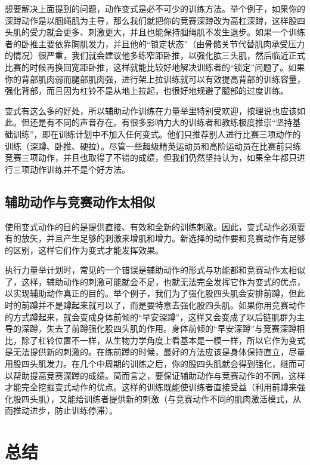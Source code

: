 \documentclass[fontset=fandol, a4paper, 12pt, openright]{ctexbook}
\begin{document}
想要解决上面提到的问题，动作变式是必不可少的训练方法。举个例子，如果你的深蹲动作是以腘绳肌为主导，那么我们就把你的竞赛深蹲改为高杠深蹲，这样股四头肌的受力就会更多、刺激更大，并且也能保持腘绳肌不发生退步。如果一个训练者的卧推主要依靠胸肌发力，并且他的“锁定状态”（由骨骼关节代替肌肉承受压力的情况）很严重，我们就会建议他多练窄距卧推，以强化肱三头肌，然后临近正式比赛的时候再换回宽距卧推，这样就能比较好地解决训练者的“锁定”问题了。如果你的背部肌肉弱而腿部肌肉强，进行架上拉训练就可以有效提高背部的训练容量，强化背部，而且因为杠铃不是从地上拉起，也很好地规避了腿部的过度训练。

变式有这么多的好处，所以辅助动作训练在力量举里特别受欢迎，按理说也应该如此。但还是有不同的声音存在。有很多影响力大的训练者和教练极度推崇“坚持基础训练”，即在训练计划中不加入任何变式。他们只推荐别人进行比赛三项动作的训练（深蹲、卧推、硬拉）。尽管一些超级精英运动员和高阶运动员在比赛前只练竞赛三项动作，并且也取得了不错的成绩，但我们仍然坚持认为，如果全年都只进行三项动作训练并不是个好方法。

\subsection{辅助动作与竞赛动作太相似}

使用变式动作的目的是提供直接、有效和全新的训练刺激。因此，变式动作必须要有的放矢，并且产生足够的刺激来增肌和增力。新选择的动作要和竞赛动作有足够的区别，这样它们作为变式才能发挥效果。

执行力量举计划时，常见的一个错误是辅助动作的形式与功能都和竞赛动作太相似了，这样，辅助动作的刺激可能就会不足，也就无法完全发挥它作为变式的优点，以实现辅助动作真正的目的。举个例子，我们为了强化股四头肌会安排前蹲，但此时的前蹲并不是蹲起来就可以了，而是要特意去强化股四头肌。如果你用竞赛动作的方式蹲起来，就会变成身体前倾的“早安深蹲”，这样又会变成了以后链肌群为主导的深蹲，失去了前蹲强化股四头肌的作用。身体前倾的“早安深蹲”与竞赛深蹲相比，除了杠铃位置不一样，从生物力学角度上看基本是一模一样，所以它作为变式是无法提供新的刺激的。在练前蹲的时候，最好的方法应该是身体保持直立，尽量用股四头肌发力。在几个中周期的训练之后，你的股四头肌就会得到强化，继而可以帮助提高竞赛深蹲的成绩。简而言之，要保证辅助动作与竞赛动作的不同，这样才能完全挖掘变式动作的优点。这样的训练既能使训练者直接受益（利用前蹲来强化股四头肌），又能给训练者提供新的刺激（与竞赛动作不同的肌肉激活模式，从而推动进步，防止训练停滞）。

\section{总结}
\end{document}
